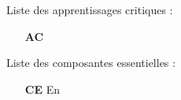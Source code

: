 \begin{minipage}[t]{.53\textwidth}%
  \sloppy
  Liste des apprentissages critiques :
  \begin{itemize}
  \item[\textbf{AC \VAR{ac.num|le}}] 
  \end{itemize}
  Liste des composantes essentielles :
  \begin{itemize}
  \item[\textbf{CE \VAR{loop.index}}] En 
  \end{itemize}
\end{minipage}



